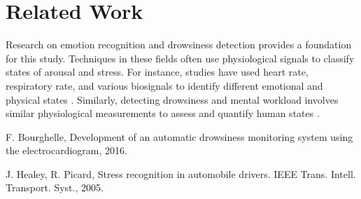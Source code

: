 \documentclass{article}
\begin{document}
\section{Related Work}
Research on emotion recognition and drowsiness detection provides a foundation for this study. Techniques in these fields often use physiological signals to classify states of arousal and stress. For instance, studies have used heart rate, respiratory rate, and various biosignals to identify different emotional and physical states \cite{drowsiness_detection}. Similarly, detecting drowsiness and mental workload involves similar physiological measurements to assess and quantify human states \cite{emotion_recognition}.




\begin{thebibliography}{9}
F. Bourghelle, Development of an automatic drowsiness monitoring system using the electrocardiogram, 2016.

J. Healey, R. Picard, Stress recognition in automobile drivers. IEEE Trans. Intell. Transport. Syst., 2005.
\end{thebibliography}
\end{document}
